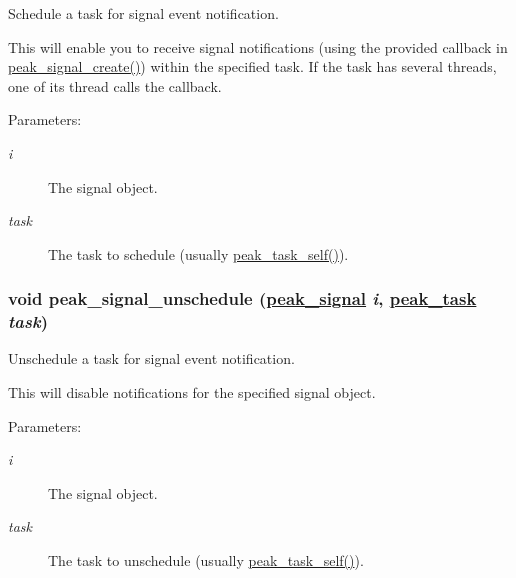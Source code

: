 Schedule a task for signal event notification. 

This will enable you to receive signal notifications (using the provided callback in \hyperlink{group__signal_ga5}{peak\_\-signal\_\-create()}) within the specified task. If the task has several threads, one of its thread calls the callback.

\begin{Desc}
\item[Parameters:]
\begin{description}
\item[{\em i}]The signal object. \item[{\em task}]The task to schedule (usually \hyperlink{group__task__common_ga8}{peak\_\-task\_\-self()}). \end{description}
\end{Desc}
\hypertarget{group__signal_ga5}{
\subsubsection[peak\_\-signal\_\-unschedule]{\setlength{\rightskip}{0pt plus 5cm}void peak\_\-signal\_\-unschedule (\hyperlink{group__signal_ga0}{peak\_\-signal} {\em i}, \hyperlink{group__task__common_ga0}{peak\_\-task} {\em task})}}
\label{group__signal_ga5}


Unschedule a task for signal event notification. 

This will disable notifications for the specified signal object.

\begin{Desc}
\item[Parameters:]
\begin{description}
\item[{\em i}]The signal object. \item[{\em task}]The task to unschedule (usually \hyperlink{group__task__common_ga8}{peak\_\-task\_\-self()}). \end{description}
\end{Desc}
